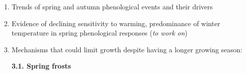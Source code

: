 \documentclass{article}
\begin{document}
\begin{enumerate}
	\item  Trends of spring and autumn phenological events and their drivers \citep{walther_ecological_2002}
	\item Evidence of declining sensitivity to warming, predominance of winter temperature in spring phenological responses (\textit{to work on}) \citep{ettinger_winter_2020}
	\item Mechanisms that could limit growth despite having a longer growing season: \\
	\par
		\textbf{3.1. Spring frosts} \\ %
\end{enumerate}
\end{document}
